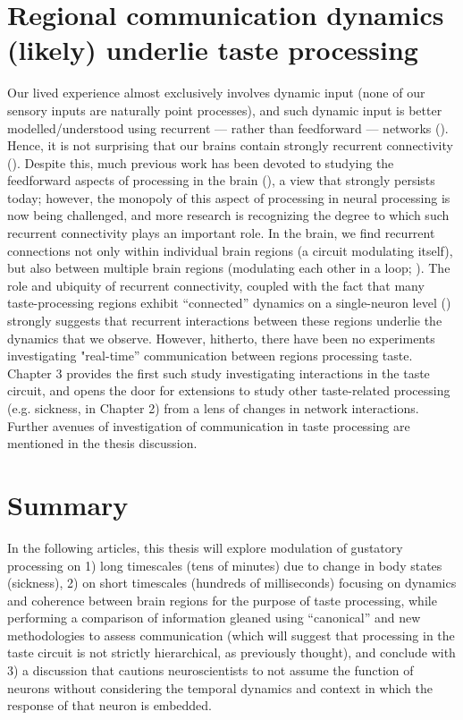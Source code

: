 \begin{refsection}
\section{Regional communication dynamics (likely) underlie taste processing}
Our lived experience almost exclusively involves dynamic input (none of our sensory inputs are naturally point processes), and such dynamic input is better modelled/understood using recurrent --- rather than feedforward --- networks (\cite{kietzmann2019a,alamia2020a}). Hence, it is not surprising that our brains contain strongly recurrent connectivity (\cite{rigotti2010a,bergen2020a,matsumoto2022a}). 
Despite this, much previous work has been devoted to studying the feedforward aspects of processing in the brain (\cite{carleton2010a,heidari-gorji2021a}), a view that strongly persists today; however, the monopoly of this aspect of processing in neural processing is now being challenged, and more research is recognizing the degree to which such recurrent connectivity plays an important role. In the brain, we find recurrent connections not only within individual brain regions (a circuit modulating itself), but also between multiple brain regions (modulating each other in a loop; \cite{mante2013a,hart2020a,kotekal2020a}).
The role and ubiquity of recurrent connectivity, coupled with the fact that many taste-processing regions exhibit “connected” dynamics on a single-neuron level (\cite{grossman2008a,fontanini2009a,jezzini2013a,li2013a,baez-santiago2016a}) strongly suggests that recurrent interactions between these regions underlie the dynamics that we observe. However, hitherto, there have been no experiments investigating "real-time” communication between regions processing taste. Chapter 3 provides the first such study investigating interactions in the taste circuit, and opens the door for extensions to study other taste-related processing (e.g. sickness, in Chapter 2) from a lens of changes in network interactions. Further avenues of investigation of communication in taste processing are mentioned in the thesis discussion.

\section{Summary}
In the following articles, this thesis will explore modulation of gustatory processing on 1) long timescales (tens of minutes) due to change in body states (sickness), 2) on short timescales (hundreds of milliseconds) focusing on dynamics and coherence between brain regions for the purpose of taste processing, while performing a comparison of information gleaned using “canonical” and new methodologies to assess communication (which will suggest that processing in the taste circuit is not strictly hierarchical, as previously thought), and conclude with 3) a discussion that cautions neuroscientists to not assume the function of neurons without considering the temporal dynamics and context in which the response of that neuron is embedded.

\begin{singlespace}
\printbibliography[title={References}]
\end{singlespace}

\end{refsection}